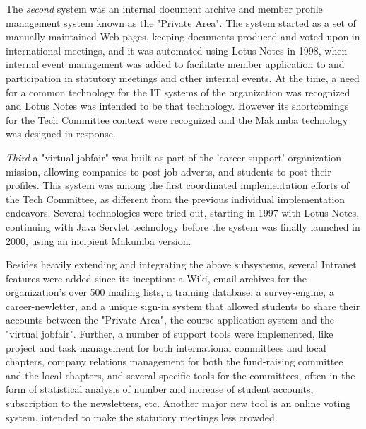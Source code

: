 \documentclass{acm_proc_article-sp}
\begin{document}
The {\it second} system was an internal document archive and member profile management system known as the "Private Area". The system started as a set of manually maintained Web pages, keeping documents produced and voted upon in international meetings, and it was automated using Lotus Notes in 1998, when internal event management was added to facilitate member application to and participation in statutory meetings and other internal events. At the time, a need for a common technology for the IT systems of the organization was recognized and Lotus Notes was intended to be that technology. However its shortcomings for the Tech Committee context were recognized and the Makumba technology was designed in response.

{\it Third} a "virtual jobfair" was built as part of the 'career support' organization mission,  allowing companies to post job adverts, and students to post their profiles. This system was among the first coordinated implementation efforts of the Tech Committee, as different from the previous individual implementation endeavors. Several technologies were tried out, starting in 1997 with Lotus Notes, continuing with Java Servlet technology before the system was finally launched in 2000, using an incipient Makumba version.

Besides heavily extending and integrating the above subsystems, several Intranet features were added since its inception: a Wiki, email archives for the organization's over 500 mailing lists, a training database, a survey-engine, a career-newletter, and a unique sign-in system that allowed students to share their accounts between the "Private Area", the course application system and the "virtual jobfair". Further, a number of support tools were implemented, like project and task management for both international committees and local chapters, company relations management for both the fund-raising committee and the local chapters, and several specific tools for the committees, often in the form of statistical analysis of number and increase of student accounts, subscription to the newsletters, etc. Another major new tool is an online voting system, intended to make the statutory meetings less crowded.
\end{document}
